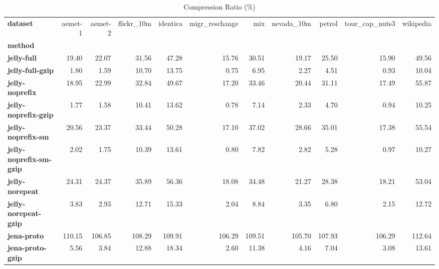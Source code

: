 \begin{table}[h!]
\small
\centering
\caption{Compression Ratio (\%)}
\begin{tabular}{lrrrrrrrrrr}
\toprule
\textbf{dataset} &  aemet-1 &  aemet-2 &  flickr\_10m &  identica &  migr\_reschange &    mix &  nevada\_10m &  petrol &  tour\_cap\_nuts3 &  wikipedia \\
\textbf{method                } &          &          &             &           &                 &        &             &         &                 &            \\
\midrule
\textbf{jelly-full            } &    19.40 &    22.07 &       31.56 &     47.28 &           15.76 &  30.51 &       19.17 &   25.50 &           15.90 &      49.56 \\
\textbf{jelly-full-gzip       } &     1.80 &     1.59 &       10.70 &     13.75 &            0.75 &   6.95 &        2.27 &    4.51 &            0.93 &      10.04 \\
\textbf{jelly-noprefix        } &    18.95 &    22.99 &       32.84 &     49.67 &           17.20 &  33.46 &       20.44 &   31.11 &           17.49 &      55.87 \\
\textbf{jelly-noprefix-gzip   } &     1.77 &     1.58 &       10.41 &     13.62 &            0.78 &   7.14 &        2.33 &    4.70 &            0.94 &      10.25 \\
\textbf{jelly-noprefix-sm     } &    20.56 &    23.37 &       33.44 &     50.28 &           17.10 &  37.02 &       28.66 &   35.01 &           17.38 &      55.54 \\
\textbf{jelly-noprefix-sm-gzip} &     2.02 &     1.75 &       10.39 &     13.61 &            0.80 &   7.82 &        2.82 &    5.28 &            0.97 &      10.27 \\
\textbf{jelly-norepeat        } &    24.31 &    24.37 &       35.89 &     56.36 &           18.08 &  34.48 &       21.27 &   28.38 &           18.21 &      53.04 \\
\textbf{jelly-norepeat-gzip   } &     3.83 &     2.93 &       12.71 &     15.33 &            2.04 &   8.84 &        3.35 &    6.80 &            2.15 &      12.72 \\
\textbf{jena-proto            } &   110.15 &   106.85 &      108.29 &    109.91 &          106.29 & 109.51 &      105.70 &  107.93 &          106.29 &     112.64 \\
\textbf{jena-proto-gzip       } &     5.56 &     3.84 &       12.88 &     18.34 &            2.60 &  11.38 &        4.16 &    7.04 &            3.08 &      13.61 \\

\end{tabular}
\end{table}
